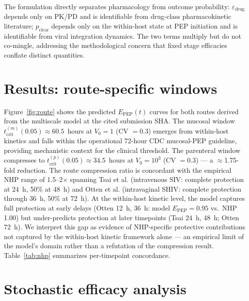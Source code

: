 \documentclass[10pt,letterpaper]{article}
\theoremstyle{definition}
\theoremstyle{remark}
\newcommand{\Epep}{E_{\text{PEP}}}
\newcommand{\tcrit}{t_{\text{crit}}}
\begin{document}
The formulation directly separates pharmacology from outcome probability: $\varepsilon_{\text{drug}}$ depends only on PK/PD and is identifiable from drug-class pharmacokinetic literature; $p_{\text{clear}}$ depends only on the within-host state at PEP initiation and is identifiable from viral integration dynamics. The two terms multiply but do not co-mingle, addressing the methodological concern that fixed stage efficacies conflate distinct quantities.

\section*{Results: route-specific windows}

Figure~\ref{fig:route} shows the predicted $\Epep(t)$ curves for both routes derived from the multiscale model at the cited submission SHA. The mucosal window $\tcrit^{(m)}(0.05) \approx 60.5$~hours at $V_{0} = 1$ (CV $= 0.3$) emerges from within-host kinetics and falls within the operational 72-hour CDC mucosal-PEP guideline\cite{tanner2025}, providing mechanistic context for the clinical threshold. The parenteral window compresses to $\tcrit^{(p)}(0.05) \approx 34.5$~hours at $V_{0} = 10^{3}$ (CV $= 0.3$) --- a $\approx$1.75-fold reduction. The route compression ratio is concordant with the empirical NHP range of 1.5--2$\times$ spanning Tsai et al.\cite{tsai1995} (intravenous SIV: complete protection at 24~h, 50\% at 48~h) and Otten et al.\cite{otten2000} (intravaginal SHIV: complete protection through 36~h, 50\% at 72~h). At the within-host kinetic level, the model captures full protection at early delays (Otten 12~h, 36~h: model $\Epep = 0.95$ vs.\ NHP 1.00) but under-predicts protection at later timepoints (Tsai 24~h, 48~h; Otten 72~h). We interpret this gap as evidence of NHP-specific protective contributions not captured by the within-host kinetic framework alone --- an empirical limit of the model's domain rather than a refutation of the compression result. Table~\ref{tab:nhp} summarizes per-timepoint concordance.

\section*{Stochastic efficacy analysis}
\end{document}
